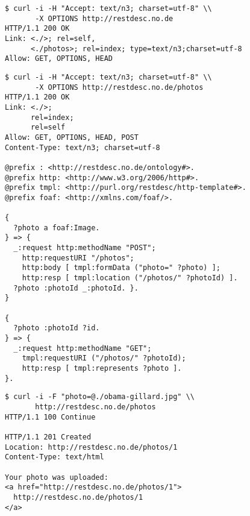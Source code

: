 \documentclass[runningheads,a4paper, twocolumn]{llncs}
\begin{document}
\begin{figure}[float=t!]
\begin{lstlisting}[caption=An OPTIONS call on an API's base URI, label=lst:BaseOPTIONS, escapechar=§]
$ curl -i -H "Accept: text/n3; charset=utf-8" \\
       -X OPTIONS http://restdesc.no.de
HTTP/1.1 200 OK
Link: <./>; rel=self,
      <./photos>; rel=index; type=text/n3;charset=utf-8
Allow: GET, OPTIONS, HEAD
\end{lstlisting}
\end{figure}

\begin{figure}[float=h!]
\begin{lstlisting}[caption=An OPTIONS call on a discovered index path from an API's base URI while accepting text/n3 responses, label=lst:PhotosOPTIONS, escapechar=§]
$ curl -i -H "Accept: text/n3; charset=utf-8" \\
       -X OPTIONS http://restdesc.no.de/photos
HTTP/1.1 200 OK
Link: <./>;
      rel=index;
      rel=self
Allow: GET, OPTIONS, HEAD, POST
Content-Type: text/n3; charset=utf-8

@prefix : <http://restdesc.no.de/ontology#>.
@prefix http: <http://www.w3.org/2006/http#>.
@prefix tmpl: <http://purl.org/restdesc/http-template#>.
@prefix foaf: <http://xmlns.com/foaf/>.

{
  ?photo a foaf:Image.
} => {
  _:request http:methodName "POST";
    http:requestURI "/photos";
    http:body [ tmpl:formData ("photo=" ?photo) ];
    http:resp [ tmpl:location ("/photos/" ?photoId) ].
  ?photo :photoId _:photoId. }.
}

{
  ?photo :photoId ?id.
} => {
  _:request http:methodName "GET";
    tmpl:requestURI ("/photos/" ?photoId);
    http:resp [ tmpl:represents ?photo ].
}.
\end{lstlisting}
\end{figure}

\begin{figure}[float=h!]
\begin{lstlisting}[caption=A POST call in order to upload a photo discovered via the Notation3 data from the previous request, label=lst:PhotoPOST, escapechar=§]
$ curl -i -F "photo=@./obama-gillard.jpg" \\
       http://restdesc.no.de/photos
HTTP/1.1 100 Continue

HTTP/1.1 201 Created
Location: http://restdesc.no.de/photos/1
Content-Type: text/html

Your photo was uploaded:
<a href="http://restdesc.no.de/photos/1">
  http://restdesc.no.de/photos/1
</a>
\end{lstlisting}
\end{figure}
\end{document}
